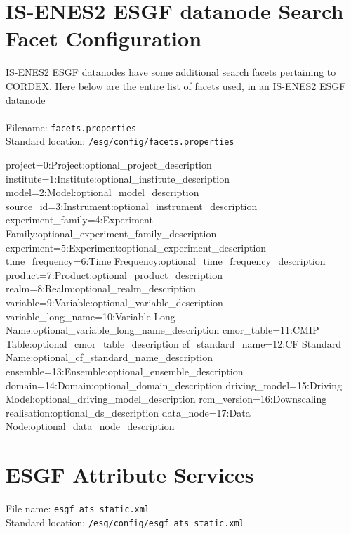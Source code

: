 \section{IS-ENES2 ESGF datanode Search Facet Configuration}
IS-ENES2 ESGF datanodes have some additional search facets pertaining to CORDEX. Here below are the entire list of facets used, in an IS-ENES2 ESGF datanode\\
\vspace{1mm}\\
Filename: \texttt{facets.properties}\\
Standard location: \texttt{/esg/config/facets.properties}
\begin{small}
\begin{verbatimtab}[4]
project=0:Project:optional_project_description
institute=1:Institute:optional_institute_description
model=2:Model:optional_model_description
source_id=3:Instrument:optional_instrument_description
experiment_family=4:Experiment Family:optional_experiment_family_description
experiment=5:Experiment:optional_experiment_description
time_frequency=6:Time Frequency:optional_time_frequency_description
product=7:Product:optional_product_description
realm=8:Realm:optional_realm_description
variable=9:Variable:optional_variable_description
variable_long_name=10:Variable Long Name:optional_variable_long_name_description
cmor_table=11:CMIP Table:optional_cmor_table_description
cf_standard_name=12:CF Standard Name:optional_cf_standard_name_description
ensemble=13:Ensemble:optional_ensemble_description
domain=14:Domain:optional_domain_description
driving_model=15:Driving Model:optional_driving_model_description
rcm_version=16:Downscaling realisation:optional_ds_description
data_node=17:Data Node:optional_data_node_description
\end{verbatimtab}
\end{small}
\section{ESGF Attribute Services}
File name: \texttt{esgf\_ats\_static.xml}\\
Standard location: \texttt{/esg/config/esgf\_ats\_static.xml}

